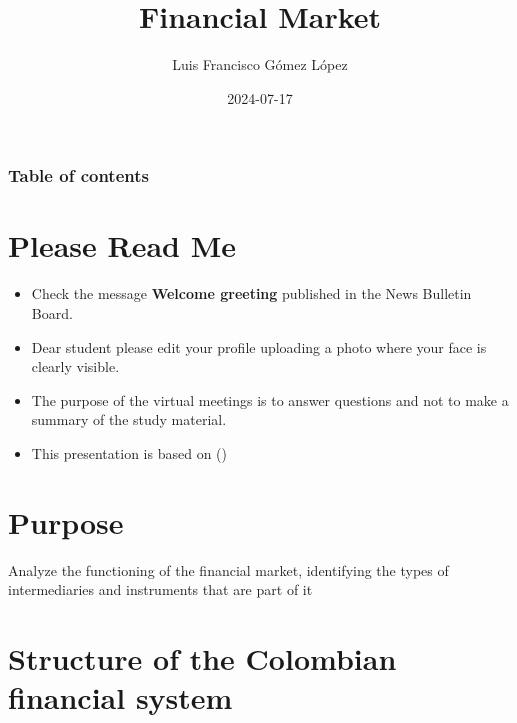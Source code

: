 \documentclass[
  ignorenonframetext,
]{beamer}
\title{Financial Market}
\author{Luis Francisco Gómez López}
\date{2024-07-17}
\institute{FAEDIS}
\renewcommand*\contentsname{Table of contents}
\newcommand\contentsname{Table of contents}
\begin{document}
\frame{\titlepage}

\renewcommand*\contentsname{Table of contents}
\begin{frame}[allowframebreaks]
  \frametitle{Table of contents}
  \tableofcontents[hideallsubsections]
\end{frame}

\section{Please Read Me}\label{please-read-me}

\begin{frame}{}
\label{section}
\begin{itemize}
\item
  Check the message \textbf{Welcome greeting} published in the News
  Bulletin Board.
\item
  Dear student please edit your profile uploading a photo where your
  face is clearly visible.
\item
  The purpose of the virtual meetings is to answer questions and not to
  make a summary of the study material.
\item
  This presentation is based on
  ()
\end{itemize}
\end{frame}

\section{Purpose}\label{purpose}

\begin{frame}{}
\label{section-1}
Analyze the functioning of the financial market, identifying the types
of intermediaries and instruments that are part of it
\end{frame}

\section{Structure of the Colombian financial
system}\label{structure-of-the-colombian-financial-system}
\end{document}

